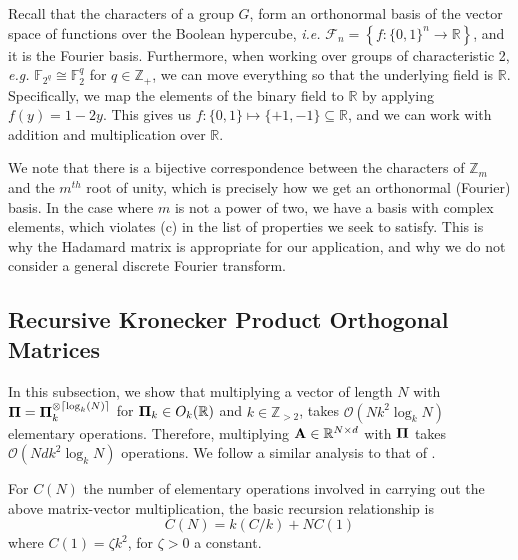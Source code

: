 \documentclass[journal,letterpaper,onecolumn,twoside,nofonttune]{IEEEtran}
\newcommand{\ow}{\mathcal{O}}
\newcommand{\Pibold}{\bold{\Pi}}
\newcommand{\Z}{\mathbb{Z}}
\newcommand{\R}{\mathbb{R}}
\newcommand{\F}{\mathbb{F}}
\newcommand{\Ab}{\bold{A}}
\DeclarePairedDelimiter\ceil{\lceil}{\rceil}
\begin{document}
Recall that the characters of a group $G$, form an orthonormal basis of the vector space of functions over the Boolean hypercube, \textit{i.e.} $\mathcal{F}_n=\left\{f:\{0,1\}^n\to\R\right\}$, and it is the Fourier basis. Furthermore, when working over groups of characteristic 2, \textit{e.g.} $\F_{2^q}\cong\F_2^q$ for $q\in\Z_+$, we can move everything so that the underlying field is $\R$. Specifically, we map the elements of the binary field to $\R$ by applying $f(y)=1-2y$. This gives us $f:\{0,1\}\mapsto\{+1,-1\}\subseteq \R$, and we can work with addition and multiplication over $\R$. 

We note that there is a bijective correspondence between the characters of $\Z_m$ and the $m^{th}$ root of unity, which is precisely how we get an orthonormal (Fourier) basis. In the case where $m$ is not a power of two, we have a basis with complex elements, which violates (c) in the list of properties we seek to satisfy. This is why the Hadamard matrix is appropriate for our application, and why we do not consider a general discrete Fourier transform.

\subsection{Recursive Kronecker Product Orthogonal Matrices}

In this subsection, we show that multiplying a vector of length $N$ with $\Pibold=\Pibold_k^{\otimes \ceil{\log_k(N)}}$ for $\Pibold_k\in O_k(\R)$ and $k\in\Z_{>2}$, takes $\ow(Nk^2\log_k N)$ elementary operations. Therefore, multiplying $\Ab\in\R^{N\times d}$ with $\Pibold$ takes $\ow(Ndk^2\log_k N)$ operations. We follow a similar analysis to that of \cite[Section 6.10.2]{Osg09}.

For $C(N)$ the number of elementary operations involved in carrying out the above matrix-vector multiplication, the basic recursion relationship is
\begin{equation}
\label{rec_relation}
  C(N) = k(C/k) + NC(1)
\end{equation}
where $C(1)=\zeta k^2$, for $\zeta >0$ a constant.%
\end{document}
